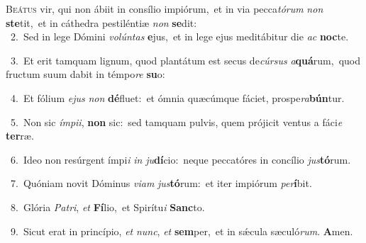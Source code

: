 \lettrine{\initial\textcolor{\initialcolor}{B}}{eátus} vir, qui non ábiit in consílio impiórum,~\dagger et in via pecca\-\textit{tó}\-\textit{rum} \textit{non} \textbf{ste}\-tit,~\star et in cáthedra pestiléntiæ \textit{non} \textbf{se}\-dit:\\
{\numbfont\textcolor{\numbcolor}{~2.}}~Sed in lege Dómini \textit{vo}\-\textit{lún}\textit{tas} \textbf{e}\-jus,~\star et in lege ejus meditábitur die \textit{ac} \textbf{noc}\-te.\par
{\numbfont\textcolor{\numbcolor}{~3.}}~Et erit tamquam lignum, quod plantátum est secus de\-\textit{cúr}\-\textit{sus} \textit{a}\-\textbf{quá}rum,~\star quod fructum suum dabit in témpo\textit{re} \textbf{su}\-o:\par
{\numbfont\textcolor{\numbcolor}{~4.}}~Et fólium \textit{e}\-\textit{jus} \textit{non} \textbf{dé}\-fluet:~\star et ómnia quæcúmque fáciet, prospe\-\textit{ra}\-\textbf{bún}tur.\par
{\numbfont\textcolor{\numbcolor}{~5.}}~Non sic \textit{ím}\-\textit{pi}\textit{i}, \textbf{non} sic:~\star sed tamquam pulvis, quem prójicit ventus a fáci\textit{e} \textbf{ter}\-ræ.\par
{\numbfont\textcolor{\numbcolor}{~6.}}~Ideo non resúrgent ímpi\textit{i} \textit{in} \textit{ju}\-\textbf{dí}cio:~\star neque peccatóres in concílio \textit{jus}\-\textbf{tó}rum.\par
{\numbfont\textcolor{\numbcolor}{~7.}}~Quóniam novit Dóminus \textit{vi}\-\textit{am} \textit{jus}\-\textbf{tó}rum:~\star et iter impiórum \textit{per}\-\textbf{í}bit.\par
{\numbfont\textcolor{\numbcolor}{~8.}}~Glória \textit{Pa}\-\textit{tri}, \textit{et} \textbf{Fí}\-lio,~\star et Spirítu\textit{i} \textbf{Sanc}\-to.\par
{\numbfont\textcolor{\numbcolor}{~9.}}~Sicut erat in princípio, \textit{et} \textit{nunc}\-, \textit{et} \textbf{sem}\-per,~\star et in sǽcula sæculó\-\textit{rum}\-. \textbf{A}\-men.\par
